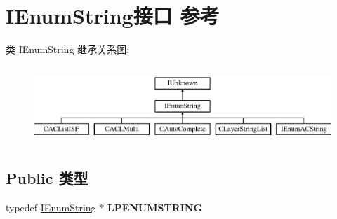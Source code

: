\hypertarget{interface_i_enum_string}{}\section{I\+Enum\+String接口 参考}
\label{interface_i_enum_string}
类 I\+Enum\+String 继承关系图\+:\begin{figure}[H]
\begin{center}
\leavevmode
\includegraphics[height=2.947368cm]{interface_i_enum_string}
\end{center}
\end{figure}
\subsection*{Public 类型}
\begin{DoxyCompactItemize}
\item 
\mbox{\label{interface_i_enum_string_a50599c286334974d22a53c1bbdb098a2}} 
typedef \hyperlink{interface_i_enum_string}{I\+Enum\+String} $\ast$ {\bfseries L\+P\+E\+N\+U\+M\+S\+T\+R\+I\+NG}
\end{DoxyCompactItemize}
